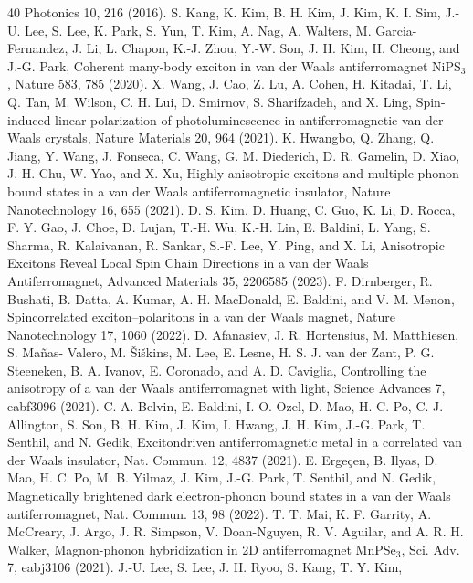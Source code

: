\documentclass[
 reprint,
superscriptaddress,

 amsmath,amssymb,
 aps,

]{revtex4-2}
\begin{document}
\begin{thebibliography}{40}
Photonics 10, 216 (2016).
S. Kang, K. Kim, B. H. Kim, J. Kim, K. I. Sim, J.-U.
Lee, S. Lee, K. Park, S. Yun, T. Kim, A. Nag, A. Walters,
M. Garcia-Fernandez, J. Li, L. Chapon, K.-J. Zhou,
Y.-W. Son, J. H. Kim, H. Cheong, and J.-G. Park, Coherent
many-body exciton in van der Waals antiferromagnet
NiPS$_3$, Nature 583, 785 (2020).
X. Wang, J. Cao, Z. Lu, A. Cohen, H. Kitadai, T. Li,
Q. Tan, M. Wilson, C. H. Lui, D. Smirnov, S. Sharifzadeh,
and X. Ling, Spin-induced linear polarization of
photoluminescence in antiferromagnetic van der Waals
crystals, Nature Materials 20, 964 (2021).
K. Hwangbo, Q. Zhang, Q. Jiang, Y. Wang, J. Fonseca,
C. Wang, G. M. Diederich, D. R. Gamelin, D. Xiao, J.-H. Chu, W. Yao, and X. Xu, Highly anisotropic excitons
and multiple phonon bound states in a van der Waals
antiferromagnetic insulator, Nature Nanotechnology 16,
655 (2021).
D. S. Kim, D. Huang, C. Guo, K. Li, D. Rocca, F. Y.
Gao, J. Choe, D. Lujan, T.-H. Wu, K.-H. Lin, E. Baldini,
L. Yang, S. Sharma, R. Kalaivanan, R. Sankar, S.-F. Lee,
Y. Ping, and X. Li, Anisotropic Excitons Reveal Local
Spin Chain Directions in a van der Waals Antiferromagnet,
Advanced Materials 35, 2206585 (2023).
F. Dirnberger, R. Bushati, B. Datta, A. Kumar, A. H.
MacDonald, E. Baldini, and V. M. Menon, Spincorrelated
exciton–polaritons in a van der Waals magnet,
Nature Nanotechnology 17, 1060 (2022).
D. Afanasiev, J. R. Hortensius, M. Matthiesen, S. Ma\~{n}as-
Valero, M. \v{S}i\v{s}kins, M. Lee, E. Lesne, H. S. J. van der
Zant, P. G. Steeneken, B. A. Ivanov, E. Coronado, and
A. D. Caviglia, Controlling the anisotropy of a van der
Waals antiferromagnet with light, Science Advances 7,
eabf3096 (2021).
C. A. Belvin, E. Baldini, I. O. Ozel, D. Mao, H. C. Po,
C. J. Allington, S. Son, B. H. Kim, J. Kim, I. Hwang,
J. H. Kim, J.-G. Park, T. Senthil, and N. Gedik, Excitondriven
antiferromagnetic metal in a correlated van der
Waals insulator, Nat. Commun. 12, 4837 (2021).
E. Erge\c{c}en, B. Ilyas, D. Mao, H. C. Po, M. B. Yilmaz,
J. Kim, J.-G. Park, T. Senthil, and N. Gedik, Magnetically
brightened dark electron-phonon bound states in
a van der Waals antiferromagnet, Nat. Commun. 13, 98
(2022).
T. T. Mai, K. F. Garrity, A. McCreary, J. Argo, J. R.
Simpson, V. Doan-Nguyen, R. V. Aguilar, and A. R. H.
Walker, Magnon-phonon hybridization in 2D antiferromagnet
MnPSe$_3$, Sci. Adv. 7, eabj3106 (2021).
J.-U. Lee, S. Lee, J. H. Ryoo, S. Kang, T. Y. Kim,

\end{thebibliography}
\end{document}
